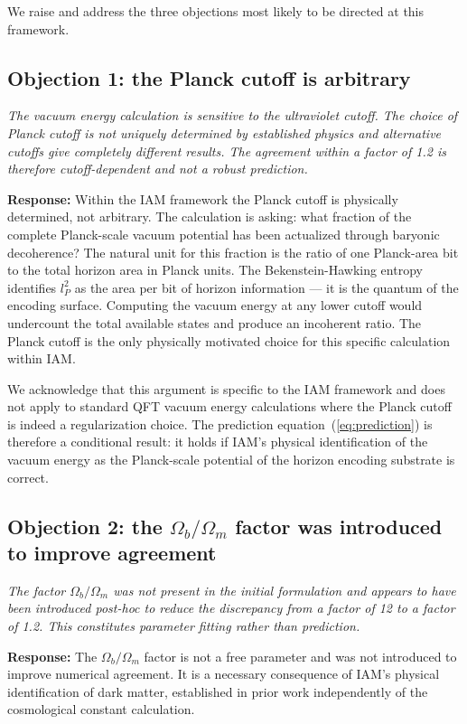 \documentclass[12pt,a4paper]{article}
\begin{document}
We raise and address the three objections most likely to be directed at
this framework.

\subsection{Objection 1: the Planck cutoff is arbitrary}

\textit{The vacuum energy calculation is sensitive to the ultraviolet
cutoff. The choice of Planck cutoff is not uniquely determined by
established physics and alternative cutoffs give completely different
results. The agreement within a factor of 1.2 is therefore cutoff-dependent
and not a robust prediction.}

\textbf{Response:} Within the IAM framework the Planck cutoff is
physically determined, not arbitrary. The calculation is asking: what
fraction of the complete Planck-scale vacuum potential has been
actualized through baryonic decoherence? The natural unit for this
fraction is the ratio of one Planck-area bit to the total horizon area
in Planck units. The Bekenstein-Hawking entropy identifies $l_P^2$ as
the area per bit of horizon information — it is the quantum of the
encoding surface. Computing the vacuum energy at any lower cutoff would
undercount the total available states and produce an incoherent ratio.
The Planck cutoff is the only physically motivated choice for this
specific calculation within IAM.

We acknowledge that this argument is specific to the IAM framework and
does not apply to standard QFT vacuum energy calculations where the
Planck cutoff is indeed a regularization choice. The prediction
equation~(\ref{eq:prediction}) is therefore a conditional result: it
holds if IAM's physical identification of the vacuum energy as the
Planck-scale potential of the horizon encoding substrate is correct.

\subsection{Objection 2: the $\Omega_b/\Omega_m$ factor was introduced
to improve agreement}

\textit{The factor $\Omega_b/\Omega_m$ was not present in the initial
formulation and appears to have been introduced post-hoc to reduce the
discrepancy from a factor of 12 to a factor of 1.2. This constitutes
parameter fitting rather than prediction.}

\textbf{Response:} The $\Omega_b/\Omega_m$ factor is not a free
parameter and was not introduced to improve numerical agreement. It is a
necessary consequence of IAM's physical identification of dark matter,
established in prior work \citep{mahaffey2026_virial_dm} independently
of the cosmological constant calculation.
\end{document}
